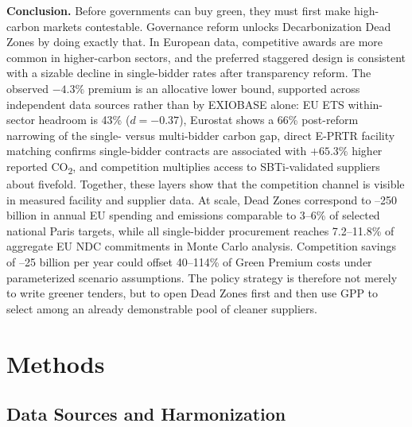 \documentclass[11pt,a4paper]{article}
\begin{document}
\textbf{Conclusion.} Before governments can buy green, they must first make high-carbon markets contestable. Governance reform unlocks Decarbonization Dead Zones by doing exactly that. In European data, competitive awards are more common in higher-carbon sectors, and the preferred staggered design is consistent with a sizable decline in single-bidder rates after transparency reform. The observed $-4.3\%$ premium is an allocative lower bound, supported across independent data sources rather than by EXIOBASE alone: EU ETS within-sector headroom is 43\% ($d = -0.37$), Eurostat shows a 66\% post-reform narrowing of the single- versus multi-bidder carbon gap, direct E-PRTR facility matching confirms single-bidder contracts are associated with $+65.3\%$ higher reported CO\textsubscript{2}, and competition multiplies access to SBTi-validated suppliers about fivefold. Together, these layers show that the competition channel is visible in measured facility and supplier data. At scale, Dead Zones correspond to --250 billion in annual EU spending and emissions comparable to 3--6\% of selected national Paris targets, while all single-bidder procurement reaches 7.2--11.8\% of aggregate EU NDC commitments in Monte Carlo analysis. Competition savings of --25 billion per year could offset 40--114\% of Green Premium costs under parameterized scenario assumptions. The policy strategy is therefore not merely to write greener tenders, but to open Dead Zones first and then use GPP to select among an already demonstrable pool of cleaner suppliers.



\section{Methods}

\subsection{Data Sources and Harmonization}
\end{document}
